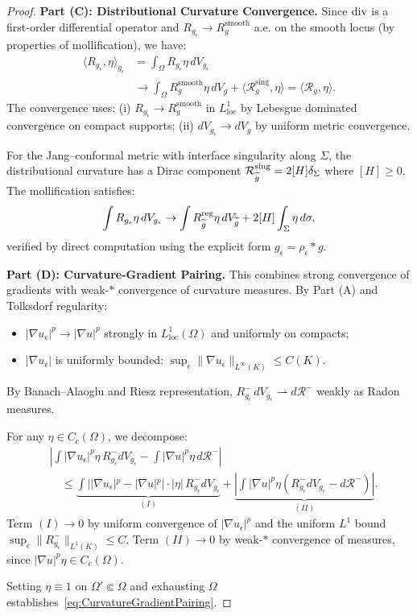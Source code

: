 \begin{proof}
\textbf{Part (C): Distributional Curvature Convergence.}
Since $\mathrm{div}$ is a first-order differential operator and $R_{g_\epsilon} \to R_g^{\mathrm{smooth}}$ a.e. on the smooth locus (by properties of mollification), we have:
\begin{align}
    \langle R_{g_\epsilon}, \eta \rangle_{g_\epsilon} &= \int_\Omega R_{g_\epsilon} \eta \, dV_{g_\epsilon} \\
    &\to \int_\Omega R_g^{\mathrm{smooth}} \eta \, dV_g + \langle \mathcal{R}_g^{\mathrm{sing}}, \eta \rangle = \langle \mathcal{R}_g, \eta \rangle.
\end{align}
The convergence uses: (i) $R_{g_\epsilon} \to R_g^{\mathrm{smooth}}$ in $L^1_{\mathrm{loc}}$ by Lebesgue dominated convergence on compact supports; (ii) $dV_{g_\epsilon} \to dV_g$ by uniform metric convergence.

For the Jang--conformal metric with interface singularity along $\Sigma$, the distributional curvature has a Dirac component $\mathcal{R}_{\widetilde{g}}^{\mathrm{sing}} = 2[H] \delta_\Sigma$ where $[H] \ge 0$. The mollification satisfies:
\[
    \int R_{g_\epsilon} \eta \, dV_{g_\epsilon} \to \int R_{\widetilde{g}}^{\mathrm{reg}} \eta \, dV_{\widetilde{g}} + 2[H] \int_\Sigma \eta \, d\sigma,
\]
verified by direct computation using the explicit form $g_\epsilon = \rho_\epsilon * g$.

\textbf{Part (D): Curvature-Gradient Pairing.}
This combines strong convergence of gradients with weak-$*$ convergence of curvature measures. By Part (A) and Tolksdorf regularity:
\begin{itemize}
    \item $|\nabla u_\epsilon|^p \to |\nabla u|^p$ strongly in $L^1_{\mathrm{loc}}(\Omega)$ and uniformly on compacts;
    \item $|\nabla u_\epsilon|$ is uniformly bounded: $\sup_\epsilon \|\nabla u_\epsilon\|_{L^\infty(K)} \le C(K)$.
\end{itemize}
By Banach--Alaoglu and Riesz representation, $R_{g_\epsilon}^- \, dV_{g_\epsilon} \rightharpoonup d\mathcal{R}^-$ weakly as Radon measures.

For any $\eta \in C_c(\Omega)$, we decompose:
\begin{align}
    &\left| \int |\nabla u_\epsilon|^p \eta \, R_{g_\epsilon}^- dV_{g_\epsilon} - \int |\nabla u|^p \eta \, d\mathcal{R}^- \right| \\
    &\quad \le \underbrace{\int ||\nabla u_\epsilon|^p - |\nabla u|^p| \cdot |\eta| \, R_{g_\epsilon}^- dV_{g_\epsilon}}_{(I)} + \underbrace{\left| \int |\nabla u|^p \eta (R_{g_\epsilon}^- dV_{g_\epsilon} - d\mathcal{R}^-) \right|}_{(II)}.
\end{align}
Term $(I) \to 0$ by uniform convergence of $|\nabla u_\epsilon|^p$ and the uniform $L^1$ bound $\sup_\epsilon \|R_{g_\epsilon}^-\|_{L^1(K)} \le C$.
Term $(II) \to 0$ by weak-$*$ convergence of measures, since $|\nabla u|^p \eta \in C_c(\Omega)$.

Setting $\eta \equiv 1$ on $\Omega' \Subset \Omega$ and exhausting $\Omega$ establishes~\eqref{eq:CurvatureGradientPairing}.
\end{proof}

